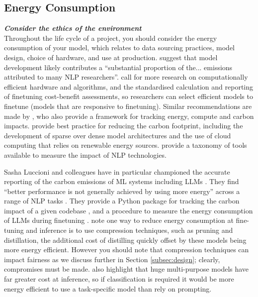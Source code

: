 \subsection{Energy Consumption}\label{subsec:energy}
\noindent\textbf{\textit{Consider the ethics of the environment}}\\

\noindent Throughout the life cycle of a project, you should consider the energy consumption of your model, which relates to data sourcing practices, model design, choice of hardware, and use at production. \citet{strubell_energy_2019} suggest that model development likely contributes a ``substantial proportion of the... emissions attributed to many NLP researchers''. 
\citet{strubell_energy_2019} call for more research on computationally efficient hardware and algorithms, and the standardised calculation and reporting of finetuning cost-benefit assessments, so researchers can select efficient models to finetune (models that are responsive to finetuning).
Similar recommendations are made by \citet{henderson_towards_2020}, who also provide a framework for tracking energy, compute and carbon impacts. 
\citet{patterson_carbon_2022} provide best practice for reducing the carbon footprint, including the development of sparse over dense model architectures and the use of cloud computing that relies on renewable energy sources. 
\citet{bannour_evaluating_2021} provide a taxonomy of tools available to measure the impact of NLP technologies. 

Sasha Luccioni and colleagues have in particular championed the accurate reporting of the carbon emissions of ML systems including LLMs \citep{luccioni_estimating_2023, luccioni_counting_2023, wang_energy_2023, luccioni_power_2024, dodge_measuring_2022, lacoste_quantifying_2019}. 
They find ``better performance is not generally achieved by using more energy'' across a range of NLP tasks \citep{luccioni_counting_2023}. 
They provide a Python package for tracking the carbon impact of a given codebase \citep{courty_mlco2codecarbon_2024}, and a procedure to measure the energy consumption of LLMs during finetuning \cite{wang_energy_2023}. 
\citet{wang_energy_2023} note one way to reduce energy consumption at fine-tuning and inference is to use compression techniques, such as pruning and distillation, the additional cost of distilling quickly offset by these models being more energy efficient. However you should note that compression techniques can impact fairness as we discuss further in Section \cref{subsec:design}; clearly, compromises must be made. \citet{luccioni_power_2024} also highlight that huge multi-purpose models have far greater cost at inference, so if classification is required it would be more energy efficient to use a task-specific model than rely on prompting. 

